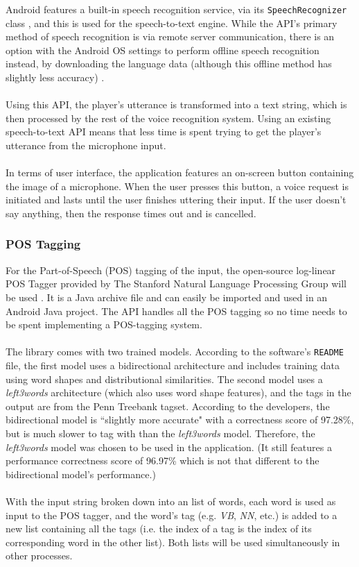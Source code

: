 \documentclass[11pt]{article}
\begin{document}
Android features a built-in speech recognition service, via its \texttt{SpeechRecognizer} class \cite{RefWorks:110}, and this is used for the speech-to-text engine. While the API's primary method of speech recognition is via remote server communication, there is an option with the Android OS settings to perform offline speech recognition instead, by downloading the language data (although this offline method has slightly less accuracy) \cite{RefWorks:111}.
\\
\\
Using this API, the player's utterance is transformed into a text string, which is then processed by the rest of the voice recognition system. Using an existing speech-to-text API means that less time is spent trying to get the player's utterance from the microphone input.
\\
\\
In terms of user interface, the application features an on-screen button containing the image of a microphone. When the user presses this button, a voice request is initiated and lasts until the user finishes uttering their input. If the user doesn't say anything, then the response times out and is cancelled.

\subsubsection{POS Tagging}

For the Part-of-Speech (POS) tagging of the input, the open-source log-linear POS Tagger provided by The Stanford Natural Language Processing Group will be used \cite{RefWorks:113}. It is a Java archive file and can easily be imported and used in an Android Java project. The API handles all the POS tagging so no time needs to be spent implementing a POS-tagging system. 
\\
\\
The library comes with two trained models. According to the software's \texttt{README} file, the first model uses a bidirectional architecture and includes training data using word shapes and distributional similarities. The second model uses a \textit{left3words} architecture (which also uses word shape features), and the tags in the output are from the Penn Treebank tagset. According to the developers, the bidirectional model is ``slightly more accurate" with a correctness score of 97.28\%, but is much slower to tag with than the \textit{left3words} model. Therefore, the \textit{left3words} model was chosen to be used in the application. (It still features a performance correctness score of 96.97\% which is not that different to the bidirectional model's performance.)
\\
\\
With the input string broken down into an list of words, each word is used as input to the POS tagger, and the word's tag (e.g. \textit{VB}, \textit{NN}, etc.) is added to a new list containing all the tags (i.e. the index of a tag is the index of its corresponding word in the other list). Both lists will be used simultaneously in other processes.
\end{document}
